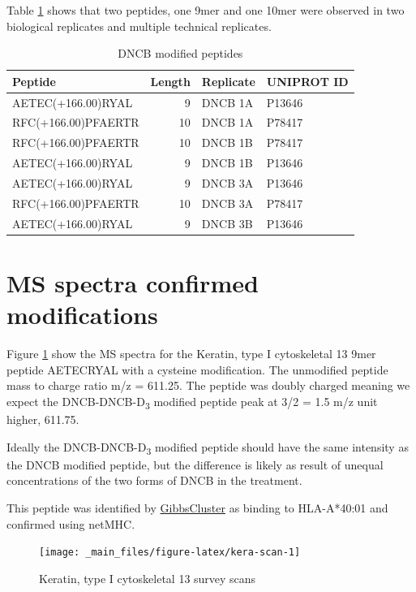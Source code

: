 \documentclass[12pt,]{book}
\begin{document}
Table \ref{tab:dncb-mods} shows that two peptides, one 9mer and one
10mer were observed in two biological replicates and multiple technical
replicates.

\begin{table}

\caption{\label{tab:dncb-mods}DNCB modified peptides}
\centering
\begin{tabular}[t]{lrll}
\toprule
Peptide & Length & Replicate & UNIPROT ID\\
\midrule
AETEC(+166.00)RYAL & 9 & DNCB 1A & P13646\\
RFC(+166.00)PFAERTR & 10 & DNCB 1A & P78417\\
RFC(+166.00)PFAERTR & 10 & DNCB 1B & P78417\\
AETEC(+166.00)RYAL & 9 & DNCB 1B & P13646\\
AETEC(+166.00)RYAL & 9 & DNCB 3A & P13646\\
\addlinespace
RFC(+166.00)PFAERTR & 10 & DNCB 3A & P78417\\
AETEC(+166.00)RYAL & 9 & DNCB 3B & P13646\\
\bottomrule
\end{tabular}
\end{table}

\section{MS spectra confirmed
modifications}\label{ms-spectra-confirmed-modifications}

Figure \ref{fig:kera-scan} show the MS spectra for the Keratin, type I
cytoskeletal 13 9mer peptide AETECRYAL with a cysteine modification. The
unmodified peptide mass to charge ratio m/z = 611.25. The peptide was
doubly charged meaning we expect the DNCB-DNCB-D\textsubscript{3}
modified peptide peak at 3/2 = 1.5 m/z unit higher, 611.75.

Ideally the DNCB-DNCB-D\textsubscript{3} modified peptide should have
the same intensity as the DNCB modified peptide, but the difference is
likely as result of unequal concentrations of the two forms of DNCB in
the treatment.

This peptide was identified by
\protect\hyperlink{clustering-of-peptides}{GibbsCluster} as binding to
HLA-A*40:01 and confirmed using netMHC.





\begin{figure}

{\centering \texttt{[image: \_main\_files/figure-latex/kera-scan-1]} 

}

\caption{Keratin, type I cytoskeletal 13 survey scans}\label{fig:kera-scan}
\end{figure}
\end{document}
